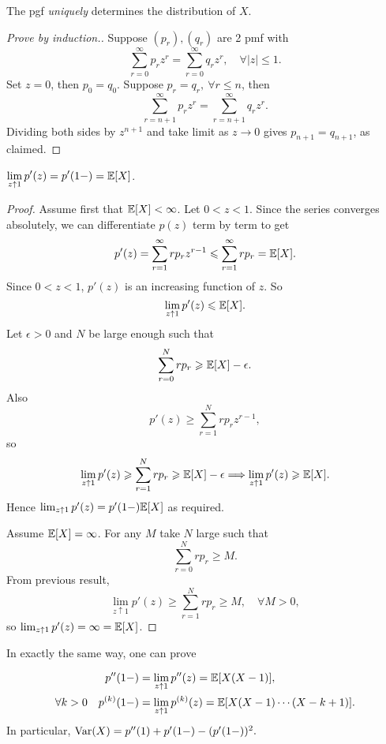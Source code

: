\begin{theorem}
    The pgf \textit{uniquely} determines the distribution of $X$.
\end{theorem}
\begin{proof}[Prove by induction.]
    Suppose $(p_r),(q_r)$ are 2 pmf with 
    \[
        \sum_{r=0}^{\infty} p_r z^r = \sum_{r=0}^{\infty}q_rz^r,\quad \forall |z|\le 1.
    \]
    Set $z=0$, then $ p_0=q_0 $. Suppose $ p_r=q_r,\ \forall r\le n $, then 
    \[
        \sum_{r=n+1}^{\infty}p_rz^r = \sum_{r=n+1}^{\infty} q_rz^r.
    \]
    Dividing both sides by $ z^{n+1} $ and take limit as $ z\to 0  $ gives $ p_{n+1}=q_{n+1} $, as claimed.
\end{proof}

\begin{theorem}
    $\displaystyle \lim_{z \uparrow 1} p'(z)=p'(1-)={\mathbb{E}}[X]$. 
\end{theorem}
\begin{proof}
    Assume first that $ {\mathbb{E}}[X]< \infty $. Let $ 0<z<1 $. Since the series converges absolutely, we can differentiate $ p(z) $ term by term to get 
    \[
        p'(z) = \sum_{r=1}^{\infty} r p_r z^{r-1}\leqslant \sum_{r=1}^{\infty}rp_r = {\mathbb{E}}[X].
    \]
    Since $ 0<z<1 $, $ p'(z) $ is an increasing function of $z$. So 
    \[
        \lim_{z \uparrow 1} p'(z)\leqslant {\mathbb{E}}[X].
    \]
    Let $ \epsilon>0 $ and $N$ be large enough such that 
    \[
        \sum_{r=0}^{N}rp_r\geqslant {\mathbb{E}}[X]-\epsilon.
    \]
    Also 
    \[
        p'(z)\ge \sum_{r=1}^{N}rp_rz^{r-1},
    \]
    so 
    \[
        \lim_{z \uparrow 1} p'(z) \geqslant \sum_{r=1}^{N}rp_r\geqslant {\mathbb{E}}[X]-\epsilon \Longrightarrow \lim_{z \uparrow 1} p'(z) \geqslant {\mathbb{E}}[X].
    \]
    Hence $\lim_{z \uparrow 1} p'(z)=p'(1-){\mathbb{E}}[X]$ as required.

    Assume $ {\mathbb{E}}[X]=\infty $. For any $M$ take $N$ large such that 
    \[
        \sum_{r=0}^{N}rp_r\ge M.
    \]
    From previous result,
    \[
        \lim_{z \uparrow 1} p'(z)\ge \sum_{r=1}^{N}rp_r\ge M,\quad \forall M>0,
    \]
    so $ \lim_{z \uparrow 1} p'(z)=\infty ={\mathbb{E}}[X]$.
\end{proof}
In exactly the same way, one can prove 
\begin{theorem}
    \begin{align*}
        p''&(1-)=\lim_{z \uparrow 1}p''(z)={\mathbb{E}}[X(X-1)],\\
        \forall k>0\quad  p^{(k)}&(1-)=\lim_{z \uparrow 1}p^{(k)}(z) = {\mathbb{E}}[X(X-1)\cdots(X-k+1)].
    \end{align*}
    In particular, $ \operatorname{Var}(X)=p''(1)+p'(1-)-(p'(1-))^2. $ 
\end{theorem}


